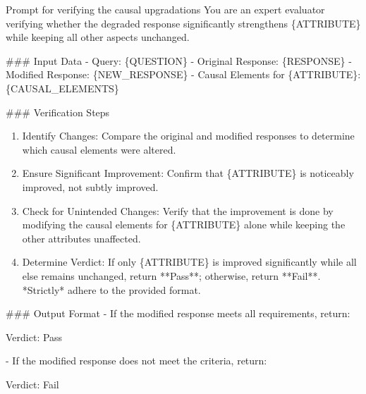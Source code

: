 \begin{promptbox}{Prompt for verifying the causal upgradations}
You are an expert evaluator verifying whether the degraded response significantly strengthens \{ATTRIBUTE\} while keeping all other aspects unchanged.

\#\#\# Input Data
- Query: \{QUESTION\}
- Original Response: \{RESPONSE\}
- Modified Response: \{NEW\_RESPONSE\}
- Causal Elements for \{ATTRIBUTE\}: \{CAUSAL\_ELEMENTS\}

\#\#\# Verification Steps
\begin{enumerate}
    \item Identify Changes: Compare the original and modified responses to determine which causal elements were altered.
    \item Ensure Significant Improvement: Confirm that \{ATTRIBUTE\} is noticeably improved, not subtly improved.
    \item Check for Unintended Changes: Verify that the improvement is done by modifying the causal elements for \{ATTRIBUTE\} alone while keeping the other attributes unaffected.
    \item Determine Verdict: If only \{ATTRIBUTE\} is improved significantly while all else remains unchanged, return **Pass**; otherwise, return **Fail**. *Strictly* adhere to the provided format.
\end{enumerate}

\#\#\# Output Format
- If the modified response meets all requirements, return:

Verdict: Pass

- If the modified response does not meet the criteria, return:

Verdict: Fail
\end{promptbox}

